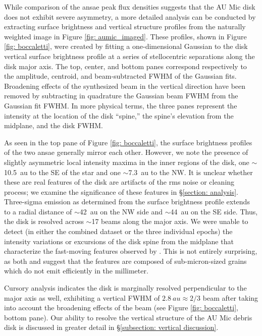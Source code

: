 \documentclass[modern]{aastex62}
\begin{document}
While comparison of the ansae peak flux densities suggests that the AU Mic disk does not exhibit severe asymmetry, a more detailed analysis can be conducted by extracting surface brightness and vertical structure profiles from the naturally weighted image in Figure \ref{fig: aumic_imaged}.
These profiles, shown in Figure \ref{fig: boccaletti}, were created by fitting a one-dimensional Gaussian to the disk vertical surface brightness profile at a series of stellocentric separations along the disk major axis.
The top, center, and bottom panes correspond respectively to the amplitude, centroid, and beam-subtracted FWHM of the Gaussian fits. 
Broadening effects of the synthesized beam in the vertical direction have been removed by subtracting in quadrature the Gaussian beam FWHM from the Gaussian fit FWHM.
In more physical terms, the three panes represent the intensity at the location of the disk ``spine,'' the spine's elevation from the midplane, and the disk FWHM.

As seen in the top pane of Figure \ref{fig: boccaletti}, the surface brightness profiles of the two ansae generally mirror each other.
However, we note the presence of slightly asymmetric local intensity maxima in the inner regions of the disk, one $\sim$\SI{10.5}{au} to the SE of the star and one $\sim$\SI{7.3}{au} to the NW. 
It is unclear whether these are real features of the disk are artifacts of the rms noise or cleaning process; we examine the significance of these features in \S \ref{section: analysis}.
Three-sigma emission as determined from the surface brightness profile extends to a radial distance of $\sim$\SI{42}{au} on the NW side and $\sim$\SI{44}{au} on the SE side. 
Thus, the disk is resolved across $\sim$17 beams along the major axis. 
We were unable to detect (in either the combined dataset or the three individual epochs) the intensity variations or excursions of the disk spine from the midplane that characterize the fast-moving features observed by \citet{boccaletti15,boccaletti18}.
This is not entirely surprising, as both \citet{sezestre17} and \citet{chiang&fung17} suggest that the features are composed of sub-micron-sized grains which do not emit efficiently in the millimeter.

Cursory analysis indicates the disk is marginally resolved perpendicular to the major axis as well, exhibiting a vertical FWHM of $\SI{2.8}{au} \approx 2/3$ beam after taking into account the broadening effects of the beam (see Figure \ref{fig: boccaletti}, bottom pane).
Our ability to resolve the vertical structure of the AU Mic debris disk is discussed in greater detail in \S \ref{subsection: vertical discussion}.
\end{document}
